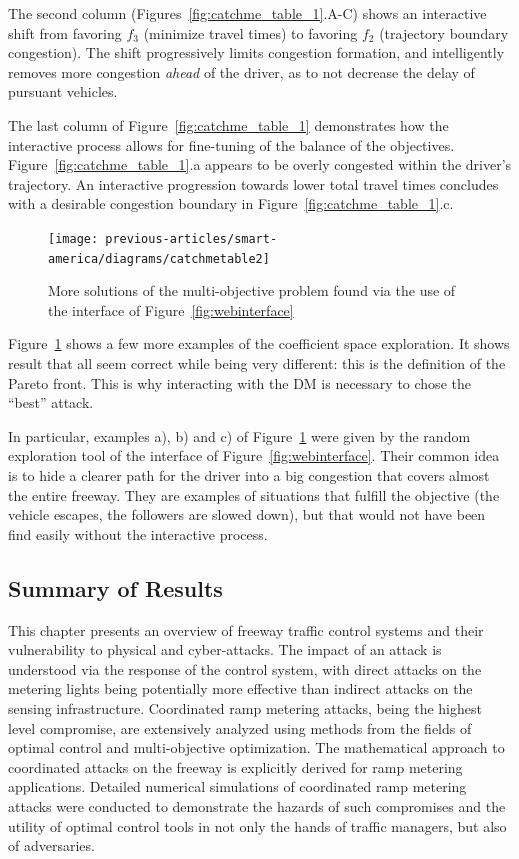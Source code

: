 The second column (Figures~\ref{fig:catchme_table_1}.A-C) shows an interactive shift from favoring $f_3$ (minimize travel times) to favoring $f_2$ (trajectory boundary congestion). The shift progressively limits congestion formation, and intelligently removes more congestion \emph{ahead} of the driver, as to not decrease the delay of pursuant vehicles.

The last column of Figure~\ref{fig:catchme_table_1} demonstrates how the interactive process allows for fine-tuning of the balance of the objectives. Figure~\ref{fig:catchme_table_1}.a appears to be overly congested within the driver's trajectory. An interactive progression towards lower total travel times concludes with a desirable congestion boundary in Figure~\ref{fig:catchme_table_1}.c.

\begin{figure}[h]
\centering
\texttt{[image: previous-articles/smart-america/diagrams/catchmetable2]}
\caption{More solutions of the multi-objective problem found via the use of the interface of Figure~\ref{fig:webinterface}}
\label{fig:catchme_table_2}
\end{figure}
Figure~\ref{fig:catchme_table_2} shows a few more examples of the coefficient space exploration. It shows result that all seem correct while being very different: this is the definition of the Pareto front. This is why interacting with the DM is necessary to chose the ``best'' attack.

In particular, examples a), b) and c) of Figure~\ref{fig:catchme_table_2} were given by the random exploration tool of the interface of Figure~\ref{fig:webinterface}. Their common idea is to hide a clearer path for the driver into a big congestion that covers almost the entire freeway. They are examples of situations that fulfill the objective (the vehicle escapes, the followers are slowed down), but that would not have been find easily without the interactive process.

\subsection{Summary of Results}

This chapter presents an overview of freeway traffic control systems and their vulnerability to physical and cyber-attacks. The impact of an attack is understood via the response of the control system, with direct attacks on the metering lights being potentially more effective than indirect attacks on the sensing infrastructure. Coordinated ramp metering attacks, being the highest level compromise,  are extensively analyzed using methods from the fields of optimal control and multi-objective optimization. The mathematical approach to coordinated attacks on the freeway is explicitly derived for ramp metering applications. Detailed numerical simulations of coordinated ramp metering attacks were conducted to demonstrate the hazards of such compromises and the utility of optimal control tools in not only the hands of traffic managers, but also of adversaries.